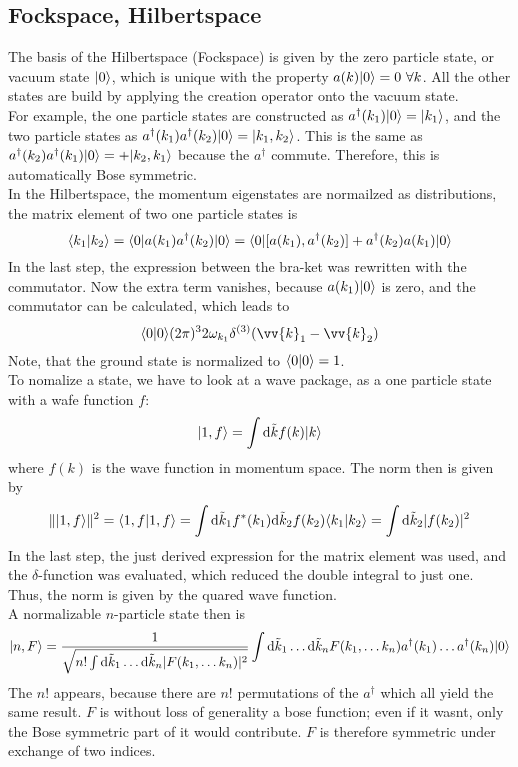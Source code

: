 \subsection{Fockspace, Hilbertspace}
The basis of the Hilbertspace (Fockspace) is given by the zero particle state, or vacuum state $|0\rangle$, which is unique with the property $a(k)|0\rangle = 0~\forall k$. All the other states are build by applying the creation operator onto the vacuum state.\\
For example, the one particle states are constructed as $a^\dagger(k_1)|0\rangle = |k_1 \rangle$, and the two particle states as $a^\dagger(k_1)a^\dagger(k_2)|0\rangle = |k_1, k_2\rangle$. This is the same as $a^\dagger(k_2)a^\dagger(k_1)|0\rangle = + |k_2,k_1\rangle$ because the $a^\dagger$ commute. Therefore, this is automatically Bose symmetric.\\
In the Hilbertspace, the momentum eigenstates are normailzed as distributions, the matrix element of two one particle states is
\[ \langle k_1 | k_2 \rangle = \langle 0 | a(k_1)a^\dagger(k_2) | 0 \rangle = \langle 0 | [ a(k_1), a^\dagger(k_2)] + a^\dagger(k_2) a(k_1)|0\rangle\]
In the last step, the expression between the bra-ket was rewritten with the commutator. Now the extra term vanishes, because $a(k_1)|0\rangle$ is zero, and the commutator can be calculated, which leads to
\[ \lk 0 | 0 \rk  (2\pi)^3 2 \omega_{k_1} \delta^{(3)}(\vv{k}_1 - \vv{k}_2)\]
Note, that the ground state is normalized to $\langle 0 | 0 \rangle = 1$.\\
To nomalize a state, we have to look at a wave package, as a one particle state with a wafe function $f$:
\[ | 1 , f\rangle = \int {\rm d} \tilde{k} f(k) |k\rangle\]
where $f(k)$ is the wave function in momentum space. The norm then is given by
\[ \| | 1, f\rangle \|^2 = \langle 1, f| 1, f\rangle = \int {\rm d}\tilde{k}_1 f^*(k_1) {\rm d} \tilde{k}_2 f(k_2) \langle k_1 |k_2\rangle = \int {\rm d} \tilde{k}_2 | f(k_2) |^2\]
In the last step, the just derived expression for the matrix element was used, and the $\delta$-function was evaluated, which reduced the double integral to just one. Thus, the norm is given by the quared wave function.\\
A normalizable $n$-particle state then is
\[ |n, F\rangle = \frac{1}{\sqrt{ n! \int {\rm d} \tilde{k}_1 \ldots {\rm d}\tilde{k}_n | F(k_1, \ldots k_n) |^2}} \int {\rm d} \tilde{k}_1 \ldots {\rm d} \tilde{k}_n F(k_1, \ldots k_n) a^\dagger(k_1) \ldots a^\dagger(k_n) |0\rangle\]
The $n!$ appears, because there are $n!$ permutations of the $a^\dagger$ which all yield the same result. $F$ is without loss of generality a bose function; even if it wasnt, only the Bose symmetric part of it would contribute. $F$ is therefore symmetric under exchange of two indices.\\
